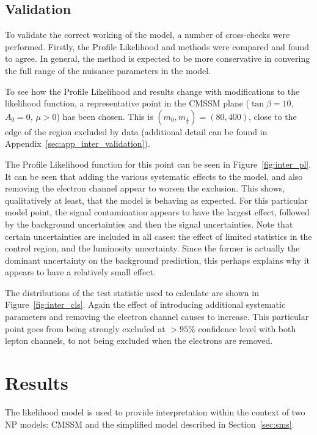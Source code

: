 \subsection{Validation}
\label{sec:inter_validation}
To validate the correct working of the model, a number of cross-checks were
performed. Firstly, the Profile Likelihood and \CLs methods were compared and
found to agree. In general, the \CLs method is expected to be more conservative
in convering the full range of the nuisance parameters in the model.

To see how the Profile Likelihood and \CLs results change with modifications to
the likelihood function, a representative point in the \ac{CMSSM} plane
($\tan\beta=10$, $A_0=0$, $\mu>0$) has been chosen. This is $(m_0,
m_{\frac{1}{2}}) = (80, 400)$, close to the edge of the region excluded by data
(additional detail can be found in Appendix~\ref{sec:app_inter_validation}).

The Profile Likelihood function for this point can be seen in
Figure~\ref{fig:inter_pl}. It can be seen that adding the various systematic
effects to the model, and also removing the electron channel appear to worsen
the exclusion. This shows, qualitatively at least, that the model is behaving as
expected. For this particular model point, the signal contamination appears to
have the largest effect, followed by the background uncertainties and then the
signal uncertainties. Note that certain uncertainties are included in all cases:
the effect of limited statistics in the control region, and the luminosity
uncertainty. Since the former is actually the dominant uncertainty on the
background prediction, this perhaps explains why it appears to have a relatively
small effect.

The distributions of the test statistic used to calculate \CLs are shown in
Figure~\ref{fig:inter_cls}. Again the effect of introducing additional
systematic parameters and removing the electron channel causes \CLs to
increase. This particular point goes from being strongly excluded at $> 95\%$
confidence level with both lepton channels, to not being excluded when the
electrons are removed.

\section{Results}
The likelihood model is used to provide interpretation within the context of two
\ac{NP} models: \ac{CMSSM} and the \Ttwott simplified model described in
Section~\ref{sec:sms}.

